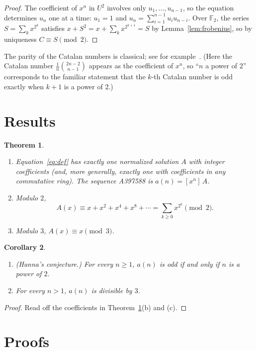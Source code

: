 \documentclass[11pt,a4paper]{article}
\newtheorem{theorem}{Theorem}[section]
\newtheorem{corollary}[theorem]{Corollary}
\theoremstyle{definition}
\theoremstyle{remark}
\newcommand{\F}{\mathbb{F}}
\newcommand{\coeff}[2]{[x^{#1}]\,#2}
\begin{document}
\begin{proof}
The coefficient of $x^n$ in $U^2$ involves only $u_1,\dots,u_{n-1}$, so the equation determines $u_n$ one at a time:
$u_1=1$ and $u_n=\sum_{i=1}^{n-1}u_iu_{n-i}$. Over $\F_2$, the series $S=\sum_kx^{2^k}$ satisfies
$x+S^2=x+\sum_kx^{2^{k+1}}=S$ by Lemma~\ref{lem:frobenius}, so by uniqueness $C\equiv S\pmod2$.
\end{proof}
The parity of the Catalan numbers is classical; see for example~\cite{deutschsagan}. (Here the Catalan number
$\frac1{n}\binom{2n-2}{n-1}$ appears as the coefficient of $x^n$, so ``$n$ a power of $2$'' corresponds to the familiar
statement that the $k$-th Catalan number is odd exactly when $k+1$ is a power of $2$.)

\section{Results}\label{sec:results}

\begin{theorem}\label{thm:main}
\begin{enumerate}[label=(\alph*)]
\item Equation~\eqref{eq:def} has exactly one normalized solution $A$ with integer coefficients (and, more generally,
exactly one with coefficients in any commutative ring). The sequence A397588 is $a(n)=\coeff{n}{A}$.
\item Modulo $2$,
\[
A(x)\equiv x+x^2+x^4+x^8+\cdots=\sum_{k\ge0}x^{2^k}\pmod 2 .
\]
\item Modulo $3$, $A(x)\equiv x\pmod3$.
\end{enumerate}
\end{theorem}

\begin{corollary}\label{cor:conj}
\begin{enumerate}[label=(\roman*)]
\item (Hanna's conjecture.) For every $n\ge1$, $a(n)$ is odd if and only if $n$ is a power of $2$.
\item For every $n>1$, $a(n)$ is divisible by $3$.
\end{enumerate}
\end{corollary}

\begin{proof}
Read off the coefficients in Theorem~\ref{thm:main}(b) and (c).
\end{proof}

\section{Proofs}\label{sec:proofs}
\end{document}
